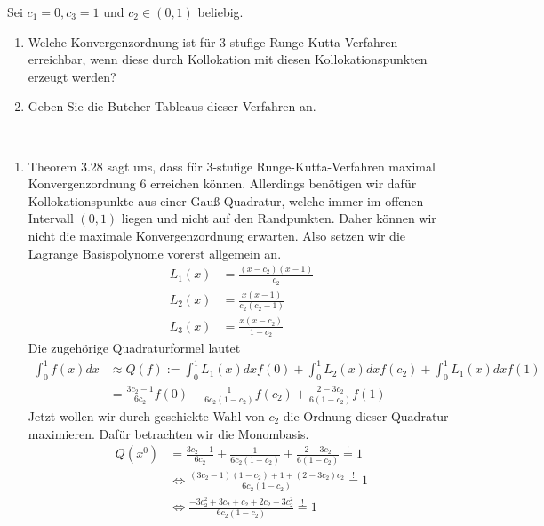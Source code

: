 \begin{exercise}
Sei $c_1 = 0, c_3 = 1$ und $c_2 \in (0,1)$ beliebig.
\begin{enumerate}[label = \textbf{\alph*)}]
  \item Welche Konvergenzordnung ist für 3-stufige Runge-Kutta-Verfahren erreichbar,
  wenn diese durch Kollokation mit diesen Kollokationspunkten erzeugt werden?
  \item Geben Sie die Butcher Tableaus dieser Verfahren an.
\end{enumerate}
\end{exercise}
\begin{solution}
\leavevmode \\
\begin{enumerate}[label = \textbf{\alph*)}]
  \item Theorem 3.28 sagt uns, dass für $3$-stufige Runge-Kutta-Verfahren
  maximal Konvergenzordnung $6$ erreichen können. Allerdings benötigen wir dafür
  Kollokationspunkte aus einer Gauß-Quadratur, welche immer
  im offenen Intervall $(0,1)$ liegen und nicht auf den Randpunkten.
  Daher können wir nicht die maximale Konvergenzordnung erwarten.
  Also setzen wir die Lagrange Basispolynome vorerst allgemein an.
  \begin{align*}
    L_1(x) &= \frac{(x-c_2)(x-1)}{c_2} \\
    L_2(x) &= \frac{x(x-1)}{c_2(c_2 - 1)} \\
    L_3(x) &= \frac{x(x - c_2)}{1 - c_2}
  \end{align*}
  Die zugehörige Quadraturformel lautet
  \begin{align*}
    \int_0^1 f(x) dx &\approx Q(f) := \int_0^1 L_1(x) dx f(0) + \int_0^1 L_2(x) dx f(c_2) +
    \int_0^1 L_1(x) dx f(1) \\
    &= \frac{3c_2 -1}{6c_2} f(0) + \frac{1}{6c_2(1 - c_2)} f(c_2) +
    \frac{2- 3c_2}{6(1 - c_2)} f(1)
  \end{align*}
  Jetzt wollen wir durch geschickte Wahl von $c_2$ die Ordnung dieser Quadratur maximieren.
  Dafür betrachten wir die Monombasis.
  \begin{align*}
    Q(x^0) &= \frac{3c_2 - 1}{6c_2} + \frac{1}{6c_2(1 - c_2)} +
    \frac{2- 3c_2}{6(1 - c_2)} \stackrel{!}{=} 1 \\
    &\iff \frac{(3c_2 - 1)(1 - c_2) + 1 + (2- 3c_2)c_2}{6c_2(1 - c_2)} \stackrel{!}{=} 1 \\
    &\iff \frac{-3c_2^2 + 3c_2 + c_2 + 2c_2 - 3c_2^2}{6c_2(1 - c_2)} \stackrel{!}{=} 1 \\

\end{align*}
\end{enumerate}
\end{solution}
